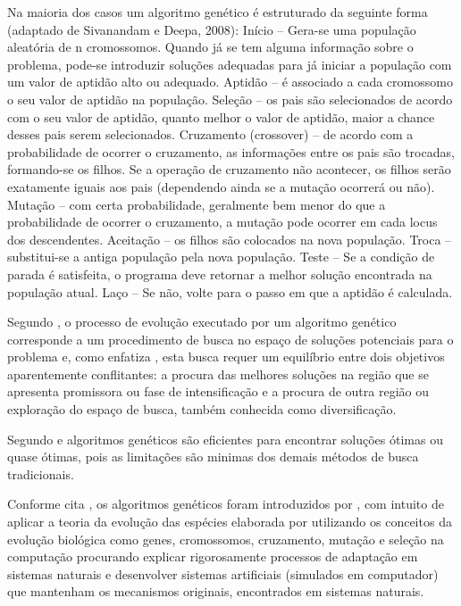 Na maioria dos casos um algoritmo genético é estruturado da seguinte forma 
(adaptado de Sivanandam e Deepa, 2008): 
Início – Gera-se uma população aleatória de n cromossomos. Quando já se tem 
alguma informação sobre o problema, pode-se introduzir soluções adequadas para já iniciar a 
população com um valor de aptidão alto ou adequado. 
Aptidão – é associado a cada cromossomo o seu valor de aptidão na população. 
Seleção – os pais são selecionados de acordo com o seu valor de aptidão, quanto 
melhor o valor de aptidão, maior a chance desses pais serem selecionados. 
Cruzamento (crossover) – de acordo com a probabilidade de ocorrer o cruzamento, 
as informações entre os pais são trocadas, formando-se os filhos. Se a operação de 
cruzamento não acontecer, os filhos serão exatamente iguais aos pais (dependendo ainda se a 
mutação ocorrerá ou não). 
Mutação – com certa probabilidade, geralmente bem menor do que a probabilidade de 
ocorrer o cruzamento, a mutação pode ocorrer em cada locus dos descendentes. 
Aceitação – os filhos são colocados na nova população. 
Troca – substitui-se a antiga população pela nova população. 
Teste – Se a condição de parada é satisfeita, o programa deve retornar a melhor 
solução encontrada na população atual. 
Laço – Se não, volte para o passo em que a aptidão é calculada. 


Segundo \cite{oliveira2005algoritmo}, o processo de evolução executado por um algoritmo genético corresponde a um procedimento de busca no espaço de soluções potenciais para o problema e, como enfatiza \cite{michalewicz1996evolutionary}, esta busca requer um equilíbrio entre dois objetivos aparentemente conflitantes: a procura das melhores soluções na região que se apresenta promissora ou fase de intensificação e a procura de outra região ou exploração do espaço de busca, também conhecida como diversificação.\par


Segundo \cite{hamawaki2011geraccao} e \cite{oliveira2005algoritmo} algoritmos genéticos são eficientes para encontrar soluções ótimas ou quase ótimas, pois as limitações são minimas dos demais métodos de busca tradicionais.


Conforme cita \cite{oliveira2005algoritmo}, os algoritmos genéticos foram introduzidos por \cite{holland1975adaptation}, com intuito de aplicar a teoria da evolução das espécies elaborada por \cite{darwin1968origin} utilizando os conceitos da evolução biológica como genes, cromossomos, cruzamento, mutação e seleção na computação procurando explicar rigorosamente processos de adaptação em sistemas naturais e desenvolver sistemas artificiais (simulados em computador) que mantenham os mecanismos originais, encontrados em sistemas naturais.\par





